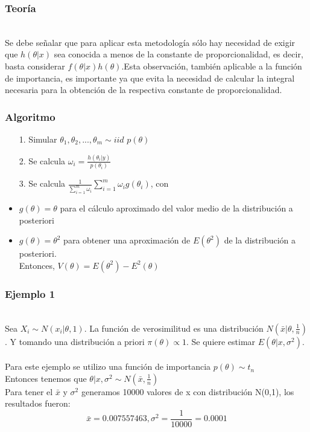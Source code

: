 \documentclass[12pt]{beamer}
\begin{document}
\begin{frame}
\frametitle{Teoría}
~\\ Se debe señalar que para aplicar esta metodología sólo hay necesidad de exigir que $h(\theta|x)$ sea conocida a menos de la constante de proporcionalidad, es decir, basta considerar $f(\theta|x)h(\theta)$.Esta observación, también aplicable a la función de importancia, es importante ya que evita la necesidad de calcular la integral necesaria para la obtención de la respectiva constante de proporcionalidad.
\end{frame}

\begin{frame}
\frametitle{Algoritmo}
\begin{itemize}
\item[1.]Simular $\theta_{1},\theta_{2},...,\theta_{m}\sim iid$  $p(\theta)$
\item[2.]Se calcula $\omega_{i}=\frac{h(\theta_{i}|y)}{p(\theta_{i})}$
\item[3.]Se calcula $\frac{1}{\sum_{i=1}^{m}\omega_{i}}\sum_{i=1}^{m}\omega_{i}g(\theta_{i})$, con
\item $g(\theta)=\theta$ para el cálculo aproximado del valor medio de la distribución a posteriori
\item $g(\theta)=\theta^{2}$ para obtener una aproximación de $E(\theta^2)$ de la distribución a posteriori.
~\\Entonces, $V(\theta)=E(\theta^2)-E^2(\theta)$
\end{itemize}
\end{frame}

\begin{frame}
\frametitle{Ejemplo 1}
~\\Sea $X_{i}\sim N(x_{i}|\theta,1)$. La función de verosimilitud es una distribución $N(\bar{x}|\theta,\frac{1}{n})$. Y tomando una distribución a priori $\pi(\theta)\propto 1$. Se quiere estimar $E(\theta|x,\sigma^2)$.\\
~\\Para este ejemplo se utilizo una función de importancia $p(\theta)\sim t_{n}$
~\\Entonces tenemos que $\theta|x,\sigma^2\sim N(\bar{x},\frac{1}{n})$
~\\Para tener el $\bar{x}$ y $\sigma^2$ generamos 10000 valores de x con distribución N(0,1), los resultados fueron:
$$\bar{x}=0.007557463, \sigma^2=\frac{1}{10000}=0.0001$$
\end{frame}
\end{document}
